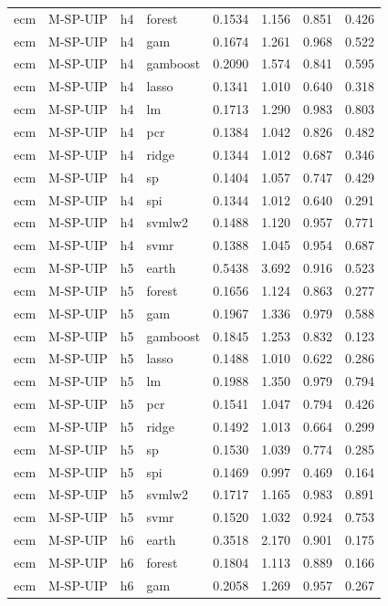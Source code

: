 \begin{ThreePartTable}
\begin{longtable}[t]{llclcccc}
ecm & M-SP-UIP & h4 & forest & 0.1534 & 1.156 & 0.851 & 0.426\\
ecm & M-SP-UIP & h4 & gam & 0.1674 & 1.261 & 0.968 & 0.522\\
ecm & M-SP-UIP & h4 & gamboost & 0.2090 & 1.574 & 0.841 & 0.595\\
ecm & M-SP-UIP & h4 & lasso & 0.1341 & 1.010 & 0.640 & 0.318\\
ecm & M-SP-UIP & h4 & lm & 0.1713 & 1.290 & 0.983 & 0.803\\
ecm & M-SP-UIP & h4 & pcr & 0.1384 & 1.042 & 0.826 & 0.482\\
ecm & M-SP-UIP & h4 & ridge & 0.1344 & 1.012 & 0.687 & 0.346\\
ecm & M-SP-UIP & h4 & sp & 0.1404 & 1.057 & 0.747 & 0.429\\
ecm & M-SP-UIP & h4 & spi & 0.1344 & 1.012 & 0.640 & 0.291\\
ecm & M-SP-UIP & h4 & svmlw2 & 0.1488 & 1.120 & 0.957 & 0.771\\
ecm & M-SP-UIP & h4 & svmr & 0.1388 & 1.045 & 0.954 & 0.687\\
\addlinespace
ecm & M-SP-UIP & h5 & earth & 0.5438 & 3.692 & 0.916 & 0.523\\
ecm & M-SP-UIP & h5 & forest & 0.1656 & 1.124 & 0.863 & 0.277\\
ecm & M-SP-UIP & h5 & gam & 0.1967 & 1.336 & 0.979 & 0.588\\
ecm & M-SP-UIP & h5 & gamboost & 0.1845 & 1.253 & 0.832 & 0.123\\
ecm & M-SP-UIP & h5 & lasso & 0.1488 & 1.010 & 0.622 & 0.286\\
ecm & M-SP-UIP & h5 & lm & 0.1988 & 1.350 & 0.979 & 0.794\\
ecm & M-SP-UIP & h5 & pcr & 0.1541 & 1.047 & 0.794 & 0.426\\
ecm & M-SP-UIP & h5 & ridge & 0.1492 & 1.013 & 0.664 & 0.299\\
ecm & M-SP-UIP & h5 & sp & 0.1530 & 1.039 & 0.774 & 0.285\\
ecm & M-SP-UIP & h5 & spi & 0.1469 & 0.997 & 0.469 & 0.164\\
ecm & M-SP-UIP & h5 & svmlw2 & 0.1717 & 1.165 & 0.983 & 0.891\\
ecm & M-SP-UIP & h5 & svmr & 0.1520 & 1.032 & 0.924 & 0.753\\
\addlinespace
ecm & M-SP-UIP & h6 & earth & 0.3518 & 2.170 & 0.901 & 0.175\\
ecm & M-SP-UIP & h6 & forest & 0.1804 & 1.113 & 0.889 & 0.166\\
ecm & M-SP-UIP & h6 & gam & 0.2058 & 1.269 & 0.957 & 0.267\\

\end{longtable}
\end{ThreePartTable}
